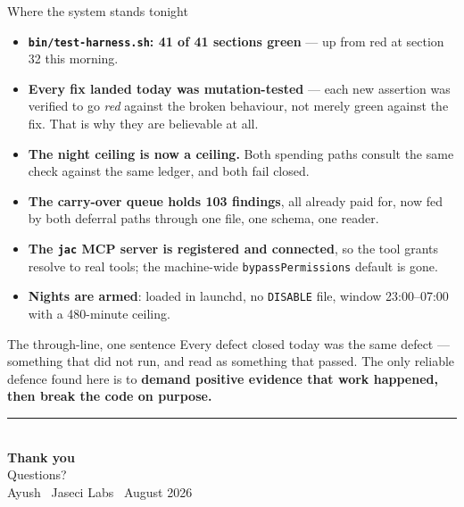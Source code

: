 \documentclass[aspectratio=169,11pt]{beamer}
\newcommand{\good}[1]{\textcolor{jsAccent}{\textbf{#1}}}
\begin{document}
\begin{frame}{Where the system stands tonight}
  \footnotesize
  \begin{itemize}
    \item \good{\texttt{bin/test-harness.sh}: 41 of 41 sections green} --- up from red at section 32 this morning.
    \item \textbf{Every fix landed today was mutation-tested} --- each new assertion was verified to go \emph{red} against the broken behaviour, not merely green against the fix. That is why they are believable at all.
    \item \textbf{The night ceiling is now a ceiling.} Both spending paths consult the same check against the same ledger, and both fail closed.
    \item \textbf{The carry-over queue holds 103 findings}, all already paid for, now fed by both deferral paths through one file, one schema, one reader.
    \item \textbf{The \texttt{jac} MCP server is registered and connected}, so the tool grants resolve to real tools; the machine-wide \texttt{bypassPermissions} default is gone.
    \item \textbf{Nights are armed}: loaded in launchd, no \texttt{DISABLE} file, window 23:00--07:00 with a 480-minute ceiling.
  \end{itemize}
  \begin{block}{The through-line, one sentence}
    \scriptsize
    Every defect closed today was the same defect --- something that did not run, and read as something that passed. The only reliable defence found here is to \textbf{demand positive evidence that work happened, then break the code on purpose.}
  \end{block}
\end{frame}


\begin{frame}[plain]
  \vfill
  \begin{center}
    {\color{jsPrimary}\rule{0.16\textwidth}{2pt}}\\[1.2em]
    {\LARGE\bfseries\color{jsPrimary}Thank you}\\[0.8em]
    {\large\color{jsInk}Questions?}\\[2.0em]
    {\footnotesize\color{jsMute}Ayush \textperiodcentered\ Jaseci Labs \textperiodcentered\ August 2026}
  \end{center}
  \vfill
\end{frame}
\end{document}

